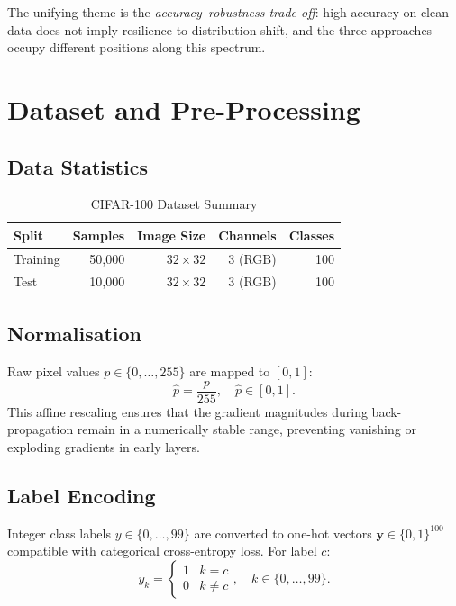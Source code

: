 \documentclass[12pt,a4paper]{article}
\begin{document}
The unifying theme is the \emph{accuracy--robustness trade-off}: high accuracy on clean data does not imply resilience to distribution shift, and the three approaches occupy different positions along this spectrum.

\section{Dataset and Pre-Processing}

\subsection{Data Statistics}

\begin{table}[H]
\centering
\caption{CIFAR-100 Dataset Summary}
\begin{tabular}{lrrrr}
\toprule
\textbf{Split} & \textbf{Samples} & \textbf{Image Size} & \textbf{Channels} & \textbf{Classes} \\
\midrule
Training & 50{,}000 & $32 \times 32$ & 3 (RGB) & 100 \\
Test     & 10{,}000 & $32 \times 32$ & 3 (RGB) & 100 \\
\bottomrule
\end{tabular}
\end{table}

\subsection{Normalisation}

Raw pixel values $p \in \{0, \ldots, 255\}$ are mapped to $[0,1]$:
\begin{equation}
    \hat{p} = \frac{p}{255}, \quad \hat{p} \in [0, 1].
\end{equation}
This affine rescaling ensures that the gradient magnitudes during back-propagation remain in a numerically stable range, preventing vanishing or exploding gradients in early layers.

\subsection{Label Encoding}

Integer class labels $y \in \{0, \ldots, 99\}$ are converted to one-hot vectors $\mathbf{y} \in \{0,1\}^{100}$ compatible with categorical cross-entropy loss. For label $c$:
\begin{equation}
    y_k = \begin{cases} 1 & k = c \\ 0 & k \neq c \end{cases}, \quad k \in \{0,\ldots,99\}.
\end{equation}
\end{document}
